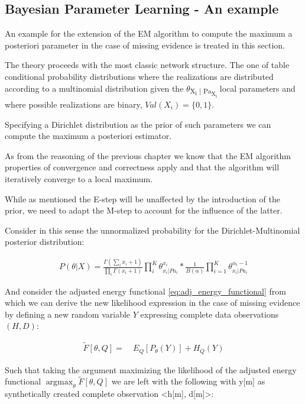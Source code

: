 \documentclass[11pt]{article}
\begin{document}
\subsection{Bayesian Parameter Learning - An example}
\label{sec:orge58cdb1}

An example for the extension of the EM algorithm to compute the
maximum a posteriori parameter in the case of missing evidence is
treated in this section.

The theory proceeds with the most classic network structure. The
one of table conditional probability distributions where the
realizations are distributed according to a multinomial
distribution given the \(\theta\)\textsubscript{X\textsubscript{i} | Pa\textsubscript{X\textsubscript{i}}} local parameters and
where possible realizations are binary, \(Val(X_i) = \{0,1 \}\).

Specifying a Dirichlet distribution as the prior of such parameters
we can compute the maximum a posteriori estimator.

As from the reasoning of the previous chapter we know that the EM
algorithm properties of convergence and correctness apply and that
the algorithm will iteratively converge to a local maximum.

While as mentioned the E-step will be unaffected by the
introduction of the prior, we need to adapt the M-step to account
for the influence of the latter.

Consider in this sense the unnormalized probability for the
Dirichlet-Multinomial posterior distribution:

\begin{align} \label{eq:dirichlet-multinomial-score}
P(\theta | X) = \frac{\Gamma(\sum_i x_i + 1)}{\prod_i \Gamma(x_i + 1)} \prod_i^K \theta_{x_i | Pa_i}^{x_i}  * \frac{1}{B(\alpha)} \prod_{i=1}^K \theta_{x_i | Pa_i}^{\alpha_i - 1}
\end{align}

And consider the adjusted energy functional
\ref{eq:adj_energy_functional} from which we can derive the new
likelihood expression in the case of missing evidence by defining a
new random variable \(Y\) expressing complete data observations
\((H, D)\):

\begin{align} \label{eq:dirichlet-multinomial-likelihood}
\tilde{F}[\theta, Q] =& \ E_Q[P_\theta(Y)] + H_Q (Y)
\end{align}

Such that taking the argument maximizing the likelihood of the
adjusted energy functional \(\operatorname*{argmax}_{\theta}
   \tilde{F}[\theta, Q]\) we are left with the following with y[m] as
synthetically created complete observation <h[m], d[m]>:
\end{document}
